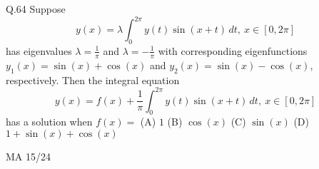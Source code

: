 \documentclass{article}
\begin{document}
																																																																																																								       Q.64 \quad Suppose
																																																																																																								       \[
																																																																																																								       y(x) = \lambda \int_0^{2\pi} y(t) \sin(x + t)\, dt,\ x \in [0,2\pi]
																																																																																																								       \]
																																																																																																								       has eigenvalues $\lambda = \frac{1}{\pi}$ and $\lambda = -\frac{1}{\pi}$ with corresponding eigenfunctions \\
																																																																																																								       $y_1(x) = \sin(x) + \cos(x)$ and $y_2(x) = \sin(x) - \cos(x)$, respectively. Then the integral equation
																																																																																																								       \[
																																																																																																								       y(x) = f(x) + \frac{1}{\pi} \int_0^{2\pi} y(t) \sin(x + t)\, dt,\ x \in [0,2\pi]
																																																																																																								       \]
																																																																																																								       has a solution when $f(x) =$
																																																																																																								       \vspace{1em} \newline
																																																																																																								       (A) $1$ \hspace{2cm} (B) $\cos(x)$ \hspace{2cm} (C) $\sin(x)$ \hspace{2cm} (D) $1 + \sin(x) + \cos(x)$
																																																																																																								       \vspace{20em}
																																																																																																								       \begin{center}
																																																																																																								           {MA 15/24}
																																																																																																									   \end{center}
																																																																																																									   \newpage
\end{document}
